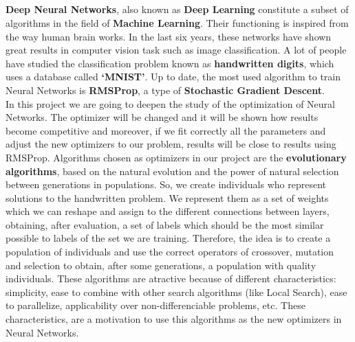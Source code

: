 \documentclass[../proyecto.tex]{book}
\begin{document}
\thispagestyle{empty}

\begin{center}
  {\large\bfseries \ProjectTitleEng}\\
\end{center}

\begin{center}
  \AuthorName\\
  \vspace{0.7cm}
  \\

  \vspace{0.7cm}
  \\
 \end{center}

  \textbf{Deep Neural Networks}, also known as \textbf{Deep Learning} constitute a subset of algorithms in the field of \textbf{Machine Learning}. Their functioning is inspired from the way human brain works. In the last six years, these networks have shown great results in computer vision task such as image classification. A lot of people have studied the classification problem known as \textbf{handwritten digits}, which uses a database called \textbf{`MNIST'}. Up to date, the most used algorithm to train Neural Networks is \textbf{RMSProp}, a type of \textbf{Stochastic Gradient Descent}. \\
  
  In this project we are going to deepen the study of the optimization of Neural Networks. The optimizer will be changed and it will be shown how results become competitive and moreover, if we fit correctly all the parameters and adjust the new optimizers to our problem, results will be close to results using RMSProp. Algorithms chosen as optimizers in our project are the \textbf{evolutionary algorithms}, based on the natural evolution and the power of natural selection between generations in populations. So, we create individuals who represent solutions to the handwritten problem. We represent them as a set of weights which we can reshape and assign to the different connections between layers, obtaining, after evaluation, a set of labels which should be the most similar possible to labels of the set we are training. Therefore, the idea is to create a population of individuals and use the correct operators of crossover, mutation and selection to obtain, after some generations, a population with quality individuals. These algorithms are atractive because of different characteristics: simplicity, ease to combine with other search algorithms (like Local Search), ease to parallelize, applicability over non-differenciable problems, etc. These characteristics,  are a motivation to use this algorithms as the new optimizers in Neural Networks. \\
  
\end{document}
